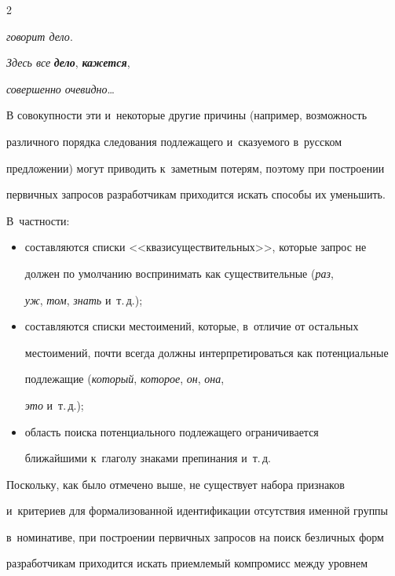 \begin{multicols}{2}
\begin{itemize}
\textit{говорит дело}.



\textit{Здесь все} {\bfseries\textit{дело}}, {\bfseries\textit{кажется}}, 

\textit{совершенно очевидно}\ldots



\end{itemize}



  В совокупности эти и~некоторые другие причины (например, возможность 

различного порядка следования подлежащего и~сказуемого в~русском 

предложении) могут приводить к~заметным потерям, поэтому при построении 

первичных запросов разработчикам приходится искать способы их уменьшить. 

В~частности: 

  \begin{itemize}

\item составляются списки <<квазисуществительных>>, которые запрос не 

должен по умолчанию воспринимать как существительные (\textit{раз}, 

\textit{уж}, \textit{том}, \textit{знать} и~т.\,д.); 

\item составляются списки местоимений, которые, в~отличие от остальных 

местоимений, почти всегда должны интерпретироваться как потенциальные 

подлежащие (\textit{который}, \textit{которое}, \textit{он}, \textit{она}, 

\textit{это} и~т.\,д.);

\item область поиска потенциального подлежащего ограничивается 

ближайшими к~глаголу знаками препинания и~т.\,д.

\end{itemize}



  Поскольку, как было отмечено выше, не существует набора признаков 

и~критериев для формализованной идентификации отсутствия именной группы 

в~номинативе, при построении первичных запросов на поиск безличных форм 

разработчикам приходится искать приемлемый компромисс между уровнем 


\end{multicols}
